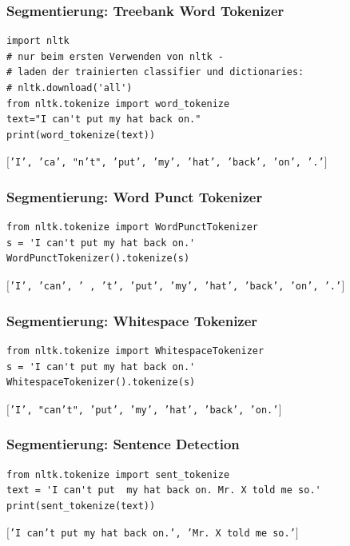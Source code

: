 \begin{frame}[fragile]
    \frametitle{Segmentierung: Treebank Word Tokenizer}
    
    \begin{verbatim}
import nltk
# nur beim ersten Verwenden von nltk -
# laden der trainierten classifier und dictionaries: 
# nltk.download('all') 
from nltk.tokenize import word_tokenize
text="I can't put my hat back on."
print(word_tokenize(text))
    \end{verbatim}

    \texttt{$[$'I', 'ca', "n't", 'put', 'my', 'hat', 'back', 'on', '.'$]$}
\end{frame}
    
    
\begin{frame}[fragile]
    \frametitle{Segmentierung: Word Punct Tokenizer}
    
    \begin{verbatim}
from nltk.tokenize import WordPunctTokenizer 
s = 'I can't put my hat back on.' 
WordPunctTokenizer().tokenize(s)
    \end{verbatim}

    \texttt{$[$'I', 'can', \dq ' \dq, 't', 'put', 'my', 'hat', 'back', 'on', '.'$]$}
\end{frame}
    
    
\begin{frame}[fragile]
    \frametitle{Segmentierung: Whitespace Tokenizer}
   
   \begin{verbatim}
from nltk.tokenize import WhitespaceTokenizer
s = 'I can't put my hat back on.'
WhitespaceTokenizer().tokenize(s)
    \end{verbatim}

    \texttt{$[$'I', "can't", 'put', 'my', 'hat', 'back', 'on.'$]$}
\end{frame}
 
    
\begin{frame}[fragile]
    \frametitle{Segmentierung: Sentence Detection}
    
    \begin{verbatim}
from nltk.tokenize import sent_tokenize
text = 'I can't put  my hat back on. Mr. X told me so.'
print(sent_tokenize(text))
    \end{verbatim}

    \texttt{$[$'I can't put  my hat back on.', 'Mr. X told me so.'$]$}
\end{frame}
    
